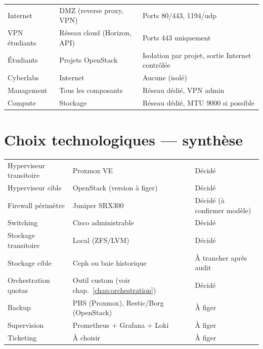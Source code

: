 \begin{xltabular}{\textwidth}{@{}llX@{}}
\toprule
{} &  &  \\
\midrule
\endhead
\bottomrule
\endfoot
\bottomrule
\endlastfoot
Internet & DMZ (reverse proxy, VPN) & Ports 80/443, 1194/udp \\
VPN étudiants & Réseau cloud (Horizon, API) & Ports 443 uniquement \\
Étudiants & Projets OpenStack & Isolation par projet, sortie Internet contrôlée \\
Cyberlabs & Internet & Aucune (isolé) \\
Management & Tous les composants & Réseau dédié, VPN admin \\
Compute & Stockage & Réseau dédié, MTU 9000 si possible \\

\end{xltabular}

\section{Choix technologiques — synthèse}
\begin{xltabular}{\textwidth}{@{}lXl@{}}
\toprule
{} &  &  \\
\midrule
\endhead
\bottomrule
\endfoot
\bottomrule
\endlastfoot
Hyperviseur transitoire & Proxmox VE & Décidé \\
Hyperviseur cible & OpenStack (version à figer) & Décidé \\
Firewall périmètre & Juniper SRX300 & Décidé (à confirmer modèle) \\
Switching & Cisco administrable & Décidé \\
Stockage transitoire & Local (ZFS/LVM) & Décidé \\
Stockage cible & Ceph ou baie historique & À trancher après audit \\
Orchestration quotas & Outil custom (voir chap.~\ref{chap:orchestration}) & Décidé \\
Backup & PBS (Proxmox), Restic/Borg (OpenStack) & À figer \\
Supervision & Prometheus + Grafana + Loki & À figer \\
Ticketing & À choisir & À figer \\

\end{xltabular}